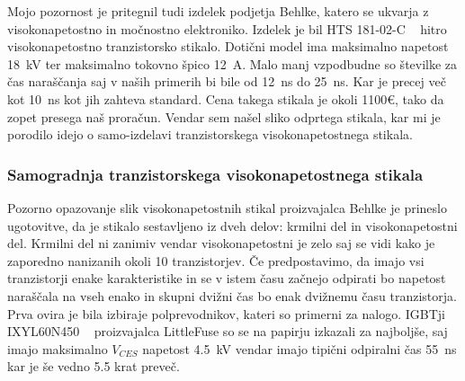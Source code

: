 \documentclass[a4paper,twoside,openright,12pt,Slovene]{book}
\begin{document}
	Mojo pozornost je pritegnil tudi izdelek podjetja Behlke, katero se ukvarja z visokonapetostno in močnostno elektroniko. Izdelek je bil HTS 181-02-C ~\cite{Behlke:HTS181-02-C} hitro visokonapetostno tranzistorsko stikalo. Dotični model ima maksimalno napetost \SI{18}{\kilo\volt} ter maksimalno tokovno špico \SI{12}{\ampere}. Malo manj vzpodbudne so številke za čas naraščanja saj v naših primerih bi bile od \SI{12}{\nano\second} do \SI{25}{\nano\second}. Kar je precej več kot \SI{10}{\nano\second} kot jih zahteva standard. Cena takega stikala je okoli 1100\euro , tako da zopet presega naš proračun. Vendar sem našel sliko odprtega stikala, kar mi je porodilo idejo o samo-izdelavi tranzistorskega visokonapetostnega stikala.
	
	\subsubsection{Samogradnja tranzistorskega visokonapetostnega stikala} \label{Samogradnja tranzistorskega visokonapetostnega stikala}
	
	Pozorno opazovanje slik visokonapetostnih stikal proizvajalca Behlke je prineslo ugotovitve, da je stikalo sestavljeno iz dveh delov: krmilni del in visokonapetostni del. Krmilni del ni zanimiv vendar visokonapetostni je zelo saj se vidi kako je zaporedno nanizanih okoli 10 tranzistorjev. Če predpostavimo, da imajo vsi tranzistorji enake karakteristike in se v istem času začnejo odpirati bo napetost naraščala na vseh enako in skupni dvižni čas bo enak dvižnemu času tranzistorja. Prva ovira je bila izbiraje polprevodnikov, kateri so primerni za nalogo. IGBTji IXYL60N450 ~\cite{IXYS:IXYL60N450} proizvajalca LittleFuse so se na papirju izkazali za najboljše, saj imajo maksimalno \(V_{CES}\) napetost \SI{4.5}{\kilo\volt} vendar imajo tipični odpiralni čas \SI{55}{\nano\second} kar je še vedno 5.5 krat preveč. 
\end{document}
